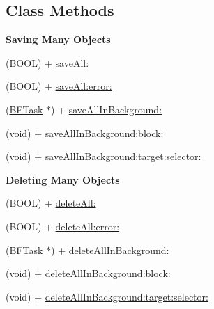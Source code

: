 \subsection*{Class Methods}
\begin{Indent}{\bf Saving Many Objects}\par
{\em 

 

 }\begin{DoxyCompactItemize}
\item 
(B\+O\+O\+L) + \hyperlink{interface_p_f_object_a9f090fc6bf0b878b3b15b679e315bfb7}{save\+All\+:}
\item 
(B\+O\+O\+L) + \hyperlink{interface_p_f_object_ab2d2d92e9ab9bfc363e9e020ca0d84e2}{save\+All\+:error\+:}
\item 
(\hyperlink{interface_b_f_task}{B\+F\+Task} $\ast$) + \hyperlink{interface_p_f_object_ad1aaa7ea173ca436bacf101fb16adce5}{save\+All\+In\+Background\+:}
\item 
(void) + \hyperlink{interface_p_f_object_a7dce84e2f8b968ce3df607ae47f3c38e}{save\+All\+In\+Background\+:block\+:}
\item 
(void) + \hyperlink{interface_p_f_object_ad8152658d26a91755b1d27f4e37c8146}{save\+All\+In\+Background\+:target\+:selector\+:}
\end{DoxyCompactItemize}
\end{Indent}
\begin{Indent}{\bf Deleting Many Objects}\par
{\em 

 

 }\begin{DoxyCompactItemize}
\item 
(B\+O\+O\+L) + \hyperlink{interface_p_f_object_ac4dd461a6c8063f7e8d4310df3198041}{delete\+All\+:}
\item 
(B\+O\+O\+L) + \hyperlink{interface_p_f_object_a68a6c625995fa77058cb797159a3d70b}{delete\+All\+:error\+:}
\item 
(\hyperlink{interface_b_f_task}{B\+F\+Task} $\ast$) + \hyperlink{interface_p_f_object_ab91511457f6ceea2b3aa4e91bd6e0201}{delete\+All\+In\+Background\+:}
\item 
(void) + \hyperlink{interface_p_f_object_a58bb3dc89e5ec241f69251f169fdc644}{delete\+All\+In\+Background\+:block\+:}
\item 
(void) + \hyperlink{interface_p_f_object_a3949313f64f4a29c02a84cdbfbe32c8d}{delete\+All\+In\+Background\+:target\+:selector\+:}
\end{DoxyCompactItemize}
\end{Indent}
